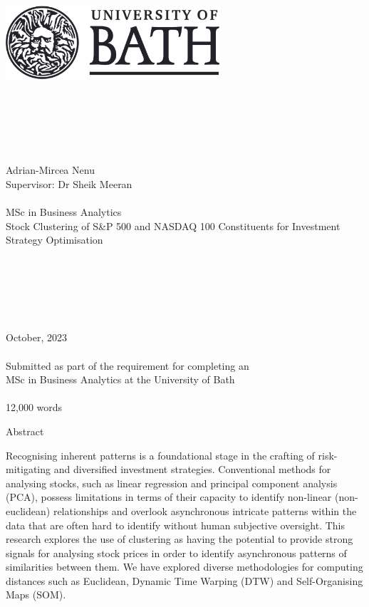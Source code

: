 \documentclass[11pt]{article}
\author{Adrian Mircea Nenu}
\begin{document}
\begin{center}
    ~\\ 
    \includegraphics[width=8cm]{img/bath.jpg} 
 
    ~\\  
    ~\\ 
    ~\\ 
    ~\\ 
    ~\\ 
    \small Adrian-Mircea Nenu
    ~\\ 
    \small Supervisor: Dr Sheik Meeran
    ~\\ 
    ~\\ 
    \large MSc in Business Analytics
    ~\\ 
    \Huge Stock Clustering of S\&P 500 and NASDAQ 100 Constituents for Investment Strategy Optimisation  
    ~\\ 
    ~\\ 
    ~\\ 
    ~\\    
            ~\\    
    ~\\    
    ~\\    
    \Large October, 2023
    ~\\    
    ~\\    
    \large Submitted as part of the requirement for completing an \\
    MSc in Business Analytics at the University of Bath
    ~\\    
    ~\\    
    \small 12,000 words
\end{center}

\thispagestyle{empty}

\newpage


\begin{center} {\LARGE Abstract} \end{center}

Recognising inherent patterns is a foundational stage in the crafting of risk-mitigating and diversified investment strategies. Conventional methods for analysing stocks, such as linear regression and principal component analysis (PCA), possess limitations in terms of their capacity to identify non-linear (non-euclidean) relationships and overlook asynchronous intricate patterns within the data that are often hard to identify without human subjective oversight. This research explores the use of clustering  as having the potential to provide strong signals for analysing stock prices in order to identify asynchronous patterns of similarities between them. We have explored  diverse methodologies for computing distances such as Euclidean, Dynamic Time Warping (DTW) and Self-Organising Maps (SOM).
\end{document}
